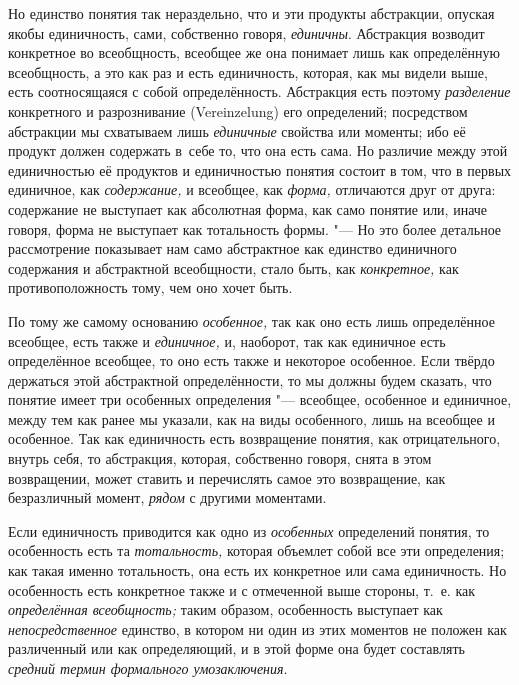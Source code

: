 Но единство понятия так нераздельно, что и эти продукты абстракции,
опуская якобы единичность, сами, собственно говоря, {\em единичны}.
Абстракция возводит конкретное во всеобщность, всеобщее же
она понимает лишь как определённую всеобщность, а это как раз и есть
единичность, которая, как мы видели выше, есть соотносящаяся с собой
определённость. Абстракция есть поэтому {\em разделение}
конкретного и разрознивание (Verein\-zelung) его
определений; посредством абстракции мы схватываем лишь
{\em единичные} свойства
или моменты; ибо её продукт должен содержать в~себе то, что она есть сама.
Но различие между этой единичностью её продуктов и единичностью понятия
состоит в том, что в первых единичное, как
{\em содержание,} и всеобщее, как {\em форма,}
отличаются друг от друга: содержание не выступает как
абсолютная форма, как само понятие или, иначе говоря, форма не выступает
как тотальность формы. "--- Но это более детальное рассмотрение
показывает нам само абстрактное как единство единичного содержания и
абстрактной всеобщности, стало быть, как
{\em конкретное,} как противоположность тому, чем оно хочет быть.

По тому же самому основанию {\em особенное,} так как
оно есть лишь определённое всеобщее, есть также и {\em единичное,} и,
наоборот, так как единичное есть определённое всеобщее, то оно есть также и
некоторое особенное. Если твёрдо держаться этой абстрактной определённости,
то мы должны будем сказать, что понятие имеет три особенных
определения "--- всеобщее, особенное и
единичное, между тем как ранее мы указали, как на виды особенного, лишь на
всеобщее и особенное. Так как единичность есть возвращение понятия, как
отрицательного, внутрь себя, то абстракция, которая, собственно говоря,
снята в этом возвращении, может ставить и перечислять самое это
возвращение, как безразличный момент, {\em рядом} с другими моментами.

Если единичность приводится как одно из {\em особенных}
определений понятия, то особенность есть та {\em тотальность,}
которая объемлет собой все эти определения; как такая именно
тотальность, она есть их конкретное или сама единичность. Но особенность
есть конкретное также и с отмеченной выше стороны, т.~е. как
{\em определённая всеобщность;}
таким образом, особенность выступает как {\em непосредственное}
единство, в котором ни один из этих моментов не положен как
различенный или как определяющий, и в этой форме она будет составлять
{\em средний термин формального умозаключения}.

